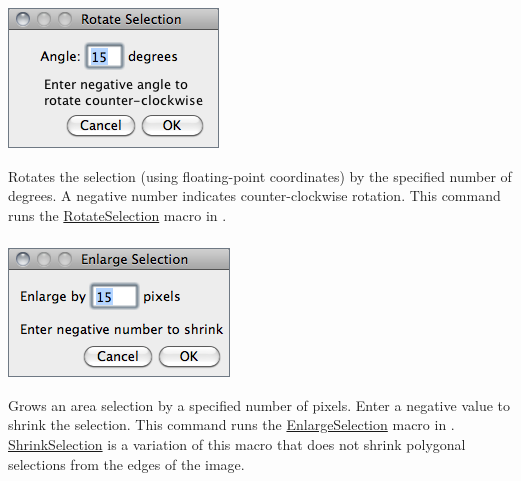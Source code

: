 \subsubsection[\protect\userinterface{Rotate\ldots{}}]{\protect{}\label{sub:Rotate...}\improvement{}}

\begin{minipage}[c][1\totalheight][t]{0.315\columnwidth}%
\includegraphics[scale=0.55]{images/RotateSelection}%
\end{minipage}%
\begin{minipage}[c][1\totalheight][t]{0.685\columnwidth}%
Rotates the selection (using floating-point coordinates)
by the specified number of degrees. A negative number indicates counter-clockwise
rotation. This command runs the \href{http://imagej.nih.gov/ij/source/macros/RotateSelection.txt}{RotateSelection}
macro in . 


%
\end{minipage}


\subsubsection{\protect{}\label{sub:Enlarge...}}

\begin{minipage}[c][1\totalheight][t]{0.325\columnwidth}%
\includegraphics[scale=0.55]{images/EnlargeSelection}%
\end{minipage}%
\begin{minipage}[c][1\totalheight][t]{0.675\columnwidth}%
Grows an area selection by a specified number of
pixels. Enter a negative value to shrink the selection. This command
runs the \href{http://imagej.nih.gov/ij/source/macros/EnlargeSelection.txt}{EnlargeSelection}
macro in . \href{http://imagej.nih.gov/ij/macros/ShrinkSelection.txt}{ShrinkSelection}
is a variation of this macro that does not shrink polygonal selections
from the edges of the image.%
\end{minipage}

